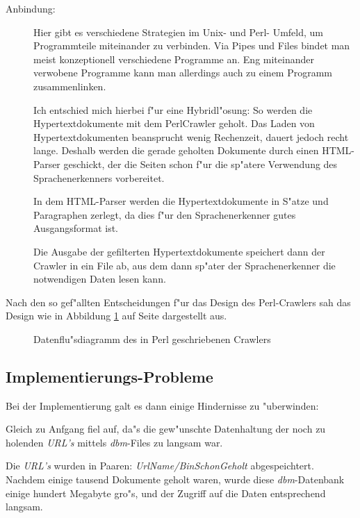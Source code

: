 \begin{description}
	\item[Anbindung:]	Hier gibt es verschiedene Strategien im Unix- und Perl- Umfeld, um Programmteile miteinander zu verbinden. Via Pipes und Files bindet man meist konzeptionell verschiedene Programme an. Eng miteinander verwobene Programme kann man allerdings auch zu einem Programm zusammenlinken.
	
	Ich entschied mich hierbei f"ur eine Hybridl"osung: So werden die Hypertextdokumente mit dem PerlCrawler geholt. Das Laden von Hypertextdokumenten beansprucht wenig Rechenzeit, dauert jedoch recht lange. Deshalb werden die gerade geholten Dokumente durch einen HTML-Parser geschickt, der die Seiten schon f"ur die sp"atere Verwendung des Sprachenerkenners vorbereitet. 
	
	In dem HTML-Parser werden die Hypertextdokumente in S"atze und Paragraphen zerlegt, da dies f"ur den Sprachenerkenner gutes Ausgangsformat ist.
	
	Die Ausgabe der gefilterten Hypertextdokumente speichert dann der Crawler in ein File ab, aus dem dann sp"ater der Sprachenerkenner die notwendigen Daten lesen kann.
	
\end{description}

Nach den so gef"allten Entscheidungen f"ur das Design des Perl-Crawlers sah das Design wie in Abbildung \ref{PerlCrawlerStruktogram} auf Seite \pageref{PerlCrawlerStruktogram} dargestellt aus.

\begin{figure}[t]
	\caption{Datenflu"sdiagramm des in Perl geschriebenen Crawlers}
	\label{PerlCrawlerStruktogram}
\end{figure}


\subsection{Implementierungs-Probleme}
Bei der Implementierung galt es dann einige Hindernisse zu "uberwinden:

Gleich zu Anfgang fiel auf, da"s die gew"unschte Datenhaltung der noch zu holenden {\em URL's} mittels {\em dbm}-Files zu langsam war. 

Die {\em URL's} wurden in Paaren: {\em UrlName/BinSchonGeholt} abgespeichtert. Nachdem einige tausend Dokumente geholt waren, wurde diese {\em dbm}-Datenbank einige hundert Megabyte gro"s, und der Zugriff auf die Daten entsprechend lang\-sam.

